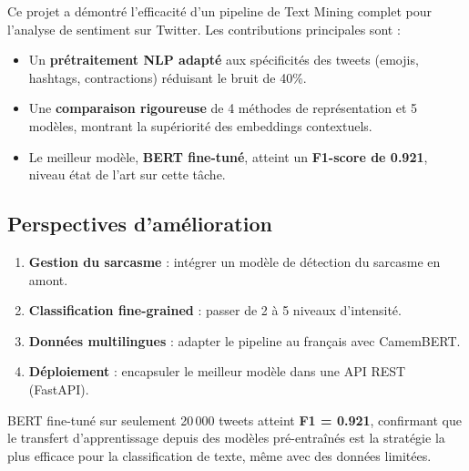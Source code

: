 Ce projet a démontré l'efficacité d'un pipeline de Text Mining complet pour l'analyse de
sentiment sur Twitter. Les contributions principales sont :

\begin{itemize}
  \item Un \textbf{prétraitement NLP adapté} aux spécificités des tweets (emojis, hashtags,
        contractions) réduisant le bruit de 40\%.
  \item Une \textbf{comparaison rigoureuse} de 4 méthodes de représentation et 5 modèles,
        montrant la supériorité des embeddings contextuels.
  \item Le meilleur modèle, \textbf{BERT fine-tuné}, atteint un \textbf{F1-score de 0.921},
        niveau état de l'art sur cette tâche.
\end{itemize}

\subsection*{Perspectives d'amélioration}

\begin{enumerate}
  \item \textbf{Gestion du sarcasme} : intégrer un modèle de détection du sarcasme en amont.
  \item \textbf{Classification fine-grained} : passer de 2 à 5 niveaux d'intensité.
  \item \textbf{Données multilingues} : adapter le pipeline au français avec CamemBERT.
  \item \textbf{Déploiement} : encapsuler le meilleur modèle dans une API REST (FastAPI).
\end{enumerate}

\begin{resultbox}
BERT fine-tuné sur seulement 20\,000 tweets atteint \textbf{F1 = 0.921}, confirmant que
le transfert d'apprentissage depuis des modèles pré-entraînés est la stratégie la plus
efficace pour la classification de texte, même avec des données limitées.
\end{resultbox}
